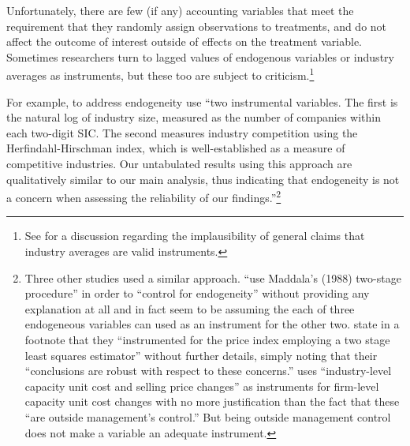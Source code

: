 \documentclass[12pt,reqno,titlepage]{amsart}
\begin{document}
\begin{doublespace}

Unfortunately, there are few (if any) accounting variables that meet the requirement that they randomly assign observations to treatments, and do not affect the outcome of interest outside of effects on the treatment variable.
Sometimes researchers turn to lagged values of endogenous variables or industry averages as instruments, but these too are subject to criticism.\footnote{
See \citet{Reiss:2007ej} for a discussion regarding the implausibility of general claims that industry averages are valid instruments.}  

For example, to address endogeneity \citet{Cohen:2014jl} use ``two instrumental variables. The first is the natural log of industry size, measured as the number of companies within each two-digit SIC. The second measures industry competition using the Herfindahl-Hirschman index, which is well-established as a measure of competitive industries. Our untabulated results using this approach are qualitatively similar to our main analysis, thus indicating that endogeneity is not a concern when assessing the reliability of our findings.''\footnote{Three other studies used a similar approach. \citet{Vermeer:2014bs} ``use Maddala's (1988) two-stage procedure'' in order to ``control for endogeneity'' without providing any explanation at all and in fact seem to be assuming the each of three endogeneous variables can used as an instrument for the other two.\citet[p.48]{Fox:2014io} state in a footnote that they ``instrumented for the price index employing a two stage least squares estimator'' without further details, simply noting that their ``conclusions are robust with respect to these concerns.''\citet{Cannon:2014im} uses ``industry-level capacity unit cost and selling price changes'' as instruments for firm-level capacity unit cost changes with no more justification than the fact that these ``are outside management's control.'' But being outside management control does not make a variable an adequate instrument.}


\end{doublespace}
\end{document}
